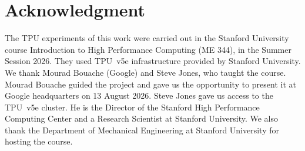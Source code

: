 \section*{Acknowledgment}
The TPU experiments of this work were carried out in the Stanford University course Introduction to High Performance
Computing (ME 344), in the Summer Session 2026. They used TPU~v5e infrastructure provided by Stanford University. %
We thank Mourad Bouache (Google) and Steve Jones, who taught the course.
Mourad Bouache guided the project and gave us the opportunity to present it at Google headquarters on 13 August 2026. %
Steve Jones gave us access to the TPU~v5e cluster. He is the Director of the
Stanford High Performance Computing Center and a Research Scientist at Stanford University. We also thank the
Department of Mechanical Engineering at Stanford University for hosting the course.
